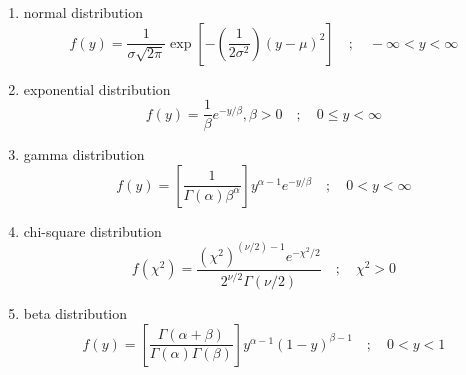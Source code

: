 \documentclass[fleqn]{article}
\begin{document}
\begin{enumerate}
\begin{enumerate}
		\item normal distribution
		\begin{displaymath}
			f(y) = \frac{1}{\sigma \sqrt{2\pi}}
			\exp \left[ - \left( \frac{1}{2\sigma^{2}} \right) 
			(y-\mu)^{2} \right] \quad ; 
			\quad -\infty < y < \infty
		\end{displaymath}
		
		\item exponential distribution
		\begin{displaymath}
			f(y) = \frac{1}{\beta} e^{-y/\beta}, \beta>0 \quad ;
			\quad 0 \le y < \infty
		\end{displaymath}
		
		
		\item gamma distribution
		\begin{displaymath}
			f(y) = \left[ \frac{1}{\Gamma(\alpha) \beta^{\alpha}} \right]
			y^{\alpha - 1} e^{-y/\beta} \quad ;
			\quad 0 < y < \infty
		\end{displaymath}
		
		
		\item chi-square distribution
		\begin{displaymath}
			f(\chi^{2}) = 
			\frac{(\chi^2)^{(\nu/2)-1} e^{-\chi^{2}/2}}
			{2^{\nu/2} \Gamma (\nu/2) } \quad ;
			\quad \chi^{2} > 0
		\end{displaymath}
		
		\item beta distribution
		\begin{displaymath}
			f(y) = \left[ 
			\frac{\Gamma(\alpha + \beta)}{\Gamma(\alpha) \Gamma(\beta)} 
			\right]
			y^{\alpha - 1} (1-y)^{\beta - 1} \quad ;
			\quad 0 < y < 1
		\end{displaymath}
		
	\end{enumerate}	
	
	
\end{enumerate}
\end{document}
